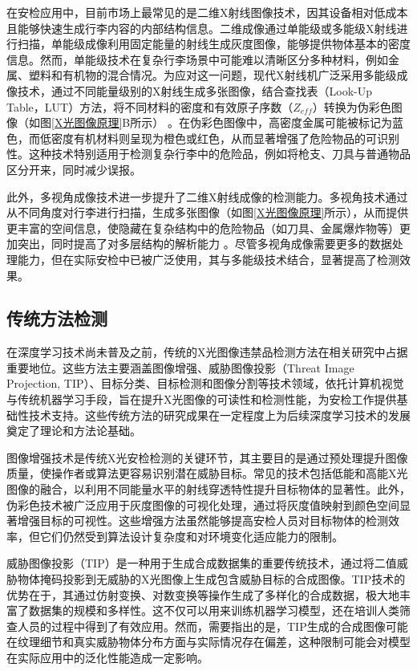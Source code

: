 \documentclass[11pt,twocolumn]{ctexart}
\begin{document}
在安检应用中，目前市场上最常见的是二维X射线图像技术，因其设备相对低成本且能够快速生成行李内容的内部结构信息。二维成像通过单能级或多能级X射线进行扫描，单能级成像利用固定能量的射线生成灰度图像，能够提供物体基本的密度信息。然而，单能级技术在复杂行李场景中可能难以清晰区分多种材料，例如金属、塑料和有机物的混合情况。为应对这一问题，现代X射线机广泛采用多能级成像技术，通过不同能量级别的X射线生成多张图像，结合查找表（Look-Up Table，LUT）方法，将不同材料的密度和有效原子序数（$Z_{eff}$）转换为伪彩色图像（如图\ref{X光图像原理}B所示）\cite{abidi2005screener} 。在伪彩色图像中，高密度金属可能被标记为蓝色，而低密度有机材料则呈现为橙色或红色，从而显著增强了危险物品的可识别性。这种技术特别适用于检测复杂行李中的危险品，例如将枪支、刀具与普通物品区分开来，同时减少误报。

此外，多视角成像技术进一步提升了二维X射线成像的检测能力。多视角技术通过从不同角度对行李进行扫描，生成多张图像（如图\ref{X光图像原理}所示），从而提供更丰富的空间信息，使隐藏在复杂结构中的危险物品（如刀具、金属爆炸物等）更加突出，同时提高了对多层结构的解析能力 \cite{mery2020computer}。尽管多视角成像需要更多的数据处理能力，但在实际安检中已被广泛使用，其与多能级技术结合，显著提高了检测效果。

\subsection{传统方法检测}
在深度学习技术尚未普及之前，传统的X光图像违禁品检测方法在相关研究中占据重要地位。这些方法主要涵盖图像增强、威胁图像投影（Threat Image Projection, TIP）、目标分类、目标检测和图像分割等技术领域，依托计算机视觉与传统机器学习手段，旨在提升X光图像的可读性和检测性能，为安检工作提供基础性技术支持。这些传统方法的研究成果在一定程度上为后续深度学习技术的发展奠定了理论和方法论基础。

图像增强技术是传统X光安检检测的关键环节，其主要目的是通过预处理提升图像质量，使操作者或算法更容易识别潜在威胁目标。常见的技术包括低能和高能X光图像的融合，以利用不同能量水平的射线穿透特性提升目标物体的显著性。此外，伪彩色技术被广泛应用于灰度图像的可视化处理，通过将灰度值映射到颜色空间显著增强目标的可视性\cite{abidi2005screener,chen2005combinational,abidi2004improving,singh2005optimizing,chan2010enhanced}。这些增强方法虽然能够提高安检人员对目标物体的检测效率，但它们仍然受到算法设计复杂度和对环境变化适应能力的限制。

威胁图像投影（TIP）是一种用于生成合成数据集的重要传统技术，通过将二值威胁物体掩码投影到无威胁的X光图像上生成包含威胁目标的合成图像。TIP技术的优势在于，其通过仿射变换、对数变换等操作生成了多样化的合成数据，极大地丰富了数据集的规模和多样性。这不仅可以用来训练机器学习模型，还在培训人类筛查人员的过程中得到了有效应用\cite{rogers2016threat,mitckes2003threat,mery2017logarithmic,cutler2009use,bhowmikevaluating}。然而，需要指出的是，TIP生成的合成图像可能在纹理细节和真实威胁物体分布方面与实际情况存在偏差，这种限制可能会对模型在实际应用中的泛化性能造成一定影响。
\end{document}
